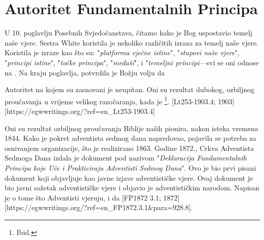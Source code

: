 \chapter{Autoritet Fundamentalnih Principa} \label{chap:authority}

U 10. poglavlju Posebnih Svjedočanstava, čitamo kako je Bog uspostavio temelj naše vjere. Sestra White koristila je nekoliko različitih izraza za temelj naše vjere. Koristila je izraze kao što su: "\textit{platforma vječne istine}", "\textit{stupovi naše vjere}", "\textit{principi istine}", "\textit{točke principa}", "\textit{međaši}", i "\textit{temeljni principi}—svi se oni odnose na . Na kraju poglavlja, potvrdila je Božju volju da 

Autoritet na kojem su  zasnovani je neupitan. Oni su rezultat dubokog, ozbiljnog proučavanja u vrijeme velikog razočaranja, kada je \footnote{Ibid.}. [Lt253-1903.4; 1903][https://egwwritings.org/?ref=en\_Lt253-1903.4]

Oni su rezultat ozbiljnog proučavanja Biblije naših pionira, nakon isteka vremena 1844. Kako je pokret adventista sedmog dana napredovao, pojavila se potreba za osnivanjem organizacije, što je realizirano 1863. Godine 1872., Crkva Adventista Sedmoga Dana izdala je dokument pod nazivom "\textit{Deklaracija Fundamentalnih Principa koje Uče i Prakticiraju Adventisti Sedmog Dana}". Ovo je bio prvi pisani dokument koji objavljuje  kao javne izjave adventističke vjere. Ovaj dokument je bio javni sažetak adventističke vjere i objavio je  adventističkim narodom. Napisan je  o tome što Adventisti vjeruju,  i da [FP1872 3.1; 1872][https://egwwritings.org/?ref=en\_FP1872.3.1&para=928.8].

